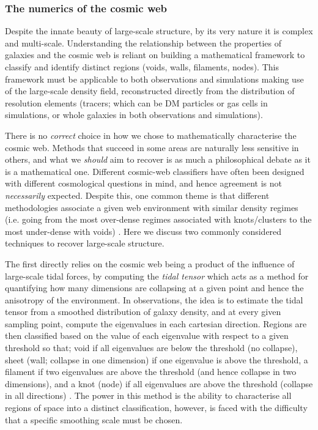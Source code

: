 \subsubsection{The numerics of the cosmic web} \label{sec:cosmo_numerics}
Despite the innate beauty of large-scale structure, by its very nature it is complex and multi-scale. Understanding the relationship between the properties of galaxies and the cosmic web is reliant on building a mathematical framework to classify and identify distinct regions (voids, walls, filaments, nodes). This framework must be applicable to both observations and simulations making use of the large-scale density field, reconstructed directly from the distribution of resolution elements (tracers; which can be DM particles or gas cells in simulations, or whole galaxies in both observations and simulations). 

There is no \textit{correct} choice in how we chose to mathematically characterise the cosmic web. Methods that succeed in some areas are naturally less sensitive in others, and what we \textit{should} aim to recover is as much a philosophical debate as it is a mathematical one. Different cosmic-web classifiers have often been designed with different cosmological questions in mind, and hence agreement is not \textit{necessarily} expected. Despite this, one common theme is that different methodologies associate a given web environment with similar density regimes (i.e. going from the most over-dense regimes associated with knots/clusters to the most under-dense with voids) \citep{libeskind2018}. Here we discuss two commonly considered techniques to recover large-scale structure.

The first directly relies on the cosmic web being a product of the influence of large-scale tidal forces, by computing the \textit{tidal tensor} which acts as a method for quantifying how many dimensions are collapsing at a given point and hence the anisotropy of the environment. In observations, the idea is to estimate the tidal tensor from a smoothed distribution of galaxy density, and at every given sampling point, compute the eigenvalues in each cartesian direction. Regions are then classified based on the value of each eigenvalue with respect to a given threshold so that; void if all eigenvalues are below the threshold (no collapse), sheet (wall; collapse in one dimension) if one eigenvalue is above the threshold, a filament if two eigenvalues are above the threshold (and hence collapse in two dimensions), and a knot (node) if all eigenvalues are above the threshold (collapse in all directions) \citep[e.g.][]{eardley2015}. The power in this method is the ability to characterise all regions of space into a distinct classification, however, is faced with the difficulty that a specific smoothing scale must be chosen.


